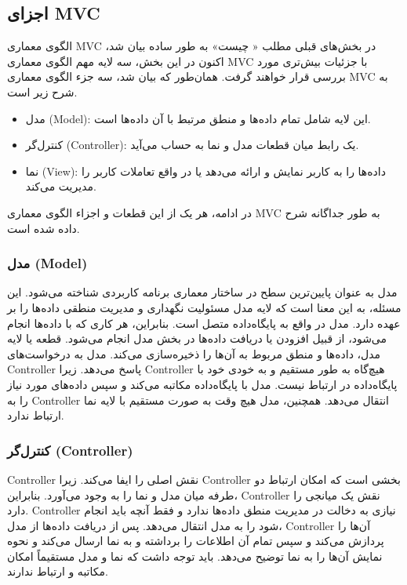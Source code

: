 \subsection{اجزای MVC}
الگوی معماری MVC در بخش‌های قبلی مطلب « چیست» به طور ساده بیان شد، اکنون در این بخش، سه لایه مهم الگوی معماری MVC با جزئیات بیش‌تری مورد بررسی قرار خواهند گرفت. همان‌طور که بیان شد، سه جزء الگوی معماری MVC به شرح زیر است.
\begin{itemize}
	\item
	مدل (Model): این لایه شامل تمام داده‌ها و منطق مرتبط با آن داده‌ها است.
	\item
	کنترل‌گر (Controller): یک رابط میان قطعات مدل و نما به حساب می‌آید.
	\item
	نما (View): داده‌ها را به کاربر نمایش و ارائه می‌دهد یا در واقع تعاملات کاربر را مدیریت می‌کند.
\end{itemize}

در ادامه، هر یک از این قطعات و اجزاء الگوی معماری MVC به طور جداگانه شرح داده شده است.

\subsubsection{مدل (Model)}
مدل به عنوان پایین‌ترین سطح در ساختار معماری برنامه کاربردی شناخته می‌شود. این مسئله، به این معنا است که لایه مدل مسئولیت نگهداری و مدیریت منطقی داده‌ها را بر عهده دارد. مدل در واقع به پایگاه‌داده متصل است. بنابراین، هر کاری که با داده‌ها انجام می‌شود، از قبیل افزودن یا دریافت داده‌ها در بخش مدل انجام می‌شود. قطعه یا لایه مدل، داده‌ها و منطق مربوط به آن‌ها را ذخیره‌سازی می‌کند. مدل به درخواست‌های Controller‌ پاسخ می‌دهد. زیرا Controller‌ هیچ‌گاه به طور مستقیم و به خودی خود با پایگاه‌داده در ارتباط نیست. مدل با پایگاه‌داده مکاتبه می‌کند و سپس داده‌های مورد نیاز را به Controller انتقال می‌دهد. همچنین، مدل هیچ وقت به صورت مستقیم با لایه نما ارتباط ندارد.

\subsubsection{کنترل‌گر (Controller)}
Controller نقش اصلی را ایفا می‌کند. زیرا Controller بخشی است که امکان ارتباط دو طرفه میان مدل و نما را به وجود می‌آورد. بنابراین، Controller نقش یک میانجی را دارد. Controller نیازی به دخالت در مدیریت منطق داده‌ها ندارد و فقط آنچه باید انجام شود را به مدل انتقال می‌دهد. پس از دریافت داده‌ها از مدل، Controller‌ آن‌ها را پردازش می‌کند و سپس تمام آن اطلاعات را برداشته و به نما ارسال می‌کند و نحوه نمایش آن‌ها را به نما توضیح می‌دهد. باید توجه داشت که نما و مدل مستقیماً امکان مکاتبه و ارتباط ندارند.

